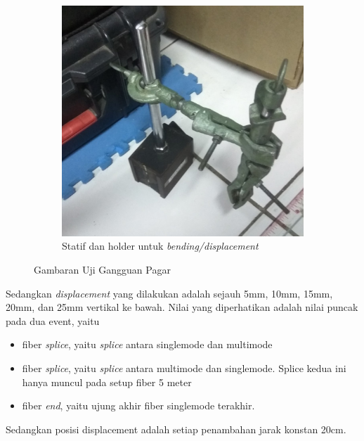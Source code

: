 \documentclass[12pt]{article}
\begin{document}
\begin{figure}[!h]
\begin{subfigure}[b]{0.4\textwidth}
			\includegraphics[width=\linewidth]{images/Bab_4/Bab_4_5c}
			\caption{\small{Statif dan holder untuk \textit{bending/displacement}}}			
		\end{subfigure}
		\caption[Uji Pagar]{\small{Gambaran Uji Gangguan Pagar }}
	\end{figure}
	
	Sedangkan \textit{displacement} yang dilakukan adalah sejauh 5mm, 10mm, 15mm, 20mm, dan 25mm vertikal ke bawah.
	Nilai yang diperhatikan adalah nilai puncak pada dua event, yaitu
	
	\begin{itemize}
		\item fiber \textit{splice}, yaitu \textit{splice} antara singlemode dan multimode  
		\item fiber \textit{splice}, yaitu \textit{splice} antara multimode dan singlemode.
		Splice kedua ini hanya muncul pada setup fiber 5 meter 
		\item fiber \textit{end}, yaitu ujung akhir fiber singlemode terakhir.
	\end{itemize}
	
	Sedangkan posisi displacement adalah setiap penambahan jarak konstan 20cm.
	
\end{document}
